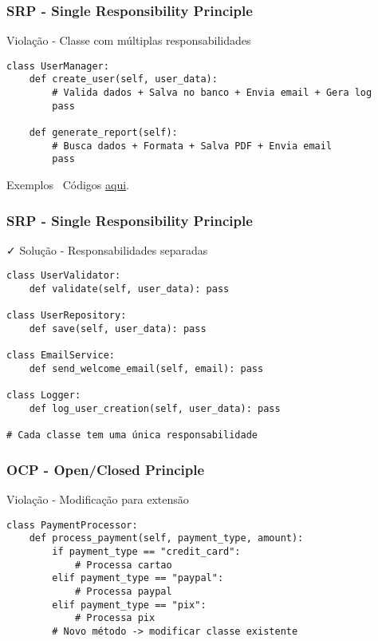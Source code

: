 \documentclass[aspectratio=169]{beamer}
\begin{document}
\begin{frame}[fragile]
\frametitle{SRP - Single Responsibility Principle}
\begin{block}{\textcolor{cleanred}{\faTimes} Violação - Classe com múltiplas responsabilidades}
\scriptsize
\begin{lstlisting}
class UserManager:
    def create_user(self, user_data):
        # Valida dados + Salva no banco + Envia email + Gera log
        pass
        
    def generate_report(self):
        # Busca dados + Formata + Salva PDF + Envia email
        pass
\end{lstlisting}
\end{block}

\vspace{0.3cm}
\begin{alertblock}{Exemplos}
\footnotesize
\faGithub \, Códigos \href{https://github.com/fmarquesfilho/bpp-2025-2/blob/main/src/s4/}{aqui}.
\end{alertblock}
\end{frame}

\begin{frame}[fragile]
\frametitle{SRP - Single Responsibility Principle}
\begin{block}{\textcolor{cleangreen}{\faCheck} Solução - Responsabilidades separadas}
\scriptsize
\begin{lstlisting}
class UserValidator:
    def validate(self, user_data): pass

class UserRepository:
    def save(self, user_data): pass

class EmailService:
    def send_welcome_email(self, email): pass

class Logger:
    def log_user_creation(self, user_data): pass

# Cada classe tem uma única responsabilidade
\end{lstlisting}
\end{block}
\end{frame}

\begin{frame}[fragile]
\frametitle{OCP - Open/Closed Principle}
\begin{block}{\textcolor{cleanred}{\faTimes} Violação - Modificação para extensão}
\scriptsize
\begin{lstlisting}
class PaymentProcessor:
    def process_payment(self, payment_type, amount):
        if payment_type == "credit_card":
            # Processa cartao
        elif payment_type == "paypal":
            # Processa paypal
        elif payment_type == "pix":
            # Processa pix
        # Novo método -> modificar classe existente
\end{lstlisting}
\end{block}
\end{frame}
\end{document}

